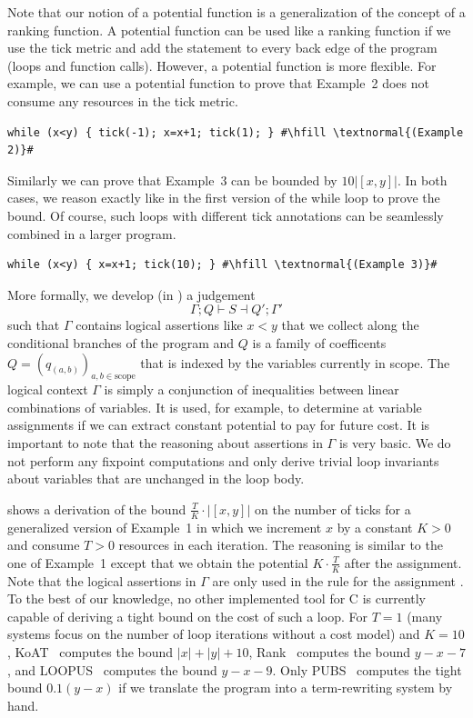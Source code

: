 \documentclass[nocopyrightspace,preprint,pldi]{sigplanconf-pldi15}
\newcommand{\pref}[1]{\prettyref{#1}}
\begin{document}
Note that our notion of a potential function is a generalization of the
concept of a ranking function.  A potential function can be used like
a ranking function if we use the tick metric and add the statement
 to every back edge of the program (loops and function
calls).  However, a potential function is more flexible.  For example,
we can use a potential function to prove that Example~2 does not
consume any resources in the tick metric.
\begin{lstlisting}[basicstyle=\tt\small]
  while (x<y) { tick(-1); x=x+1; tick(1); } #\hfill \textnormal{(Example 2)}#
\end{lstlisting}
Similarly we can prove that Example~3 can be bounded by $10|[x,y]|$.
In both cases, we reason exactly like in the first version of the
while loop to prove the bound.  Of course, such loops with different
tick annotations can be seamlessly combined in a larger program.
\begin{lstlisting}[basicstyle=\tt\small]
  while (x<y) { x=x+1; tick(10); } #\hfill \textnormal{(Example 3)}#
\end{lstlisting}
%
More formally, we develop (in \pref{sec:AAA}) a judgement
$$
\Gamma; Q \vdash S \dashv Q'; \Gamma'
$$
such that $\Gamma$ contains logical assertions like $x<y$ that we
collect along the conditional branches of the program and $Q$ is a
family of coefficents $Q = (q_{(a,b)})_{a,b \in \text{scope}}$ that is
indexed by the variables currently in scope.  The logical
context $\Gamma$ is simply a conjunction of inequalities between
linear combinations of variables.  It is used, for example, to determine
at variable assignments if we can extract constant potential to pay for future
cost.  It is important to note that the reasoning about assertions in
$\Gamma$ is very basic.  We do not perform any fixpoint computations
and only derive trivial loop invariants about variables that are
unchanged in the loop body.

\pref{fig:ex1} shows a derivation of the bound
$\frac{T}{K}{\cdot}|[x,y]|$ on the number of ticks for a generalized
version of Example~1 in which we increment $x$ by a constant $K>0$ and
consume $T>0$ resources in each iteration.  The reasoning is similar
to the one of Example~1 except that we obtain the potential
$K{\cdot}\frac{T}{K}$ after the assignment.  Note that the logical
assertions in $\Gamma$ are only used in the rule for the assignment
.  To the best of our knowledge, no other implemented tool
for C is currently capable of deriving a tight bound on the cost of
such a loop.  For $T=1$ (many systems focus on the number of loop
iterations without a cost model) and $K=10$,
KoAT~\cite{BrockschmidtEFFG14} computes the bound $|x| + |y| + 10$,
Rank~\cite{AliasDFG10} computes the bound $y-x-7$, and
LOOPUS~\cite{SinnZV14} computes the bound $y-x-9$.  Only
PUBS~\cite{AlbertAGPZ12} computes the tight bound $0.1(y-x)$ if we
translate the program into a term-rewriting system by hand.
\end{document}
